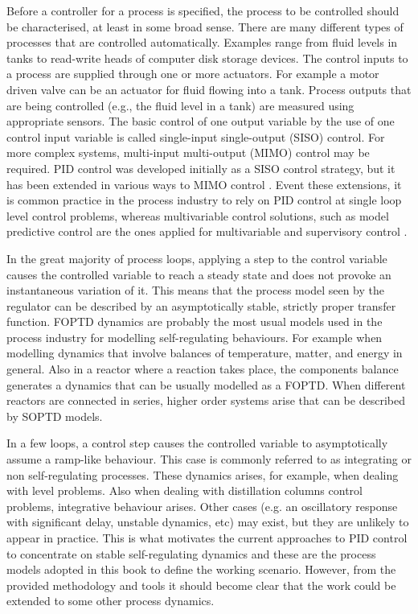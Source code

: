 Before a controller for a process is specified, the process to be controlled should be characterised, at least in some broad sense. There are many different types of processes that are controlled automatically. Examples range from fluid levels in tanks to read-write heads of computer disk storage devices. The control inputs to a process are supplied through one or more actuators. For example a motor driven valve can be an actuator for fluid flowing into a tank. Process outputs that are being controlled (e.g., the fluid level in a tank) are measured using appropriate sensors. The basic control of one output variable by the use of one control input variable is called single-input single-output (SISO) control. For more complex systems, multi-input multi-output (MIMO) control may be required. PID control was developed initially as a SISO control strategy, but it has been extended in various ways to MIMO control \citep{wang2008}. Event these extensions, it is common practice in the process industry to rely on PID control at single loop level control problems, whereas multivariable control solutions, such as model predictive control are the ones applied for multivariable and supervisory control \citep{VilanovaBook2012}.

In the great majority of process loops, applying a step to the control variable causes the controlled variable to reach a steady state and does not provoke an instantaneous variation of it. This means that the process model seen by the regulator can be described by an asymptotically stable, strictly proper transfer function. FOPTD dynamics are probably the most usual models used in the process industry for modelling self-regulating behaviours. For example when modelling dynamics that involve balances of temperature, matter, and energy in general. Also in a reactor where a reaction takes place, the components balance generates a dynamics that can be usually modelled as a FOPTD. When different reactors are connected in series, higher order systems arise that can be described by SOPTD models. 

In a few loops, a control step causes the controlled variable to asymptotically assume a ramp-like behaviour. This case is commonly referred to as  integrating or non self-regulating processes. These dynamics arises, for example, when dealing with level problems. Also when dealing with distillation columns control problems, integrative behaviour arises. Other cases (e.g. an oscillatory response with significant delay, unstable dynamics, etc) may exist, but they are unlikely to appear in practice. This is what motivates the current approaches to PID control to concentrate on stable self-regulating dynamics and these are the process models adopted in this book to define the working scenario. However, from the provided methodology and tools it should become clear that the work could be extended to some other process dynamics.

